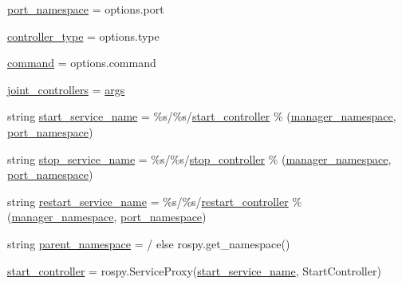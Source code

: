 \begin{DoxyCompactItemize}
\hyperlink{namespacecontroller__spawner_a831390a07e2261094656c09e0d262c14}{port\+\_\+namespace} = options.\+port
\item 
\hyperlink{namespacecontroller__spawner_a6aa09cb289adac00daaf52560e8c93ad}{controller\+\_\+type} = options.\+type
\item 
\hyperlink{namespacecontroller__spawner_a982ec8d1714fc314b5e85fc8d377abdb}{command} = options.\+command
\item 
\hyperlink{namespacecontroller__spawner_a4e454e12ceb216c43975a5ad8abee590}{joint\+\_\+controllers} = \hyperlink{namespacecontroller__spawner_aa4c2175a779b73777468233b45686392}{args}
\item 
string \hyperlink{namespacecontroller__spawner_a6f3556c19afc583ff9e7be62141ea1e3}{start\+\_\+service\+\_\+name} = \textquotesingle{}\%s/\%s/\hyperlink{namespacecontroller__spawner_a1bf65f27733e8e5fcb255dd8d369da6d}{start\+\_\+controller}\textquotesingle{} \% (\hyperlink{namespacecontroller__spawner_aee6b2ce8cdb4e7ffd894cbe211b09a0c}{manager\+\_\+namespace}, \hyperlink{namespacecontroller__spawner_a831390a07e2261094656c09e0d262c14}{port\+\_\+namespace})
\item 
string \hyperlink{namespacecontroller__spawner_addbe1e6c1654b63878f7d1d23d201d25}{stop\+\_\+service\+\_\+name} = \textquotesingle{}\%s/\%s/\hyperlink{namespacecontroller__spawner_abb7c023c547b422e17287d367fe0de8e}{stop\+\_\+controller}\textquotesingle{} \% (\hyperlink{namespacecontroller__spawner_aee6b2ce8cdb4e7ffd894cbe211b09a0c}{manager\+\_\+namespace}, \hyperlink{namespacecontroller__spawner_a831390a07e2261094656c09e0d262c14}{port\+\_\+namespace})
\item 
string \hyperlink{namespacecontroller__spawner_ae74db8f9d8ea66394dacfe6b0838e0b9}{restart\+\_\+service\+\_\+name} = \textquotesingle{}\%s/\%s/\hyperlink{namespacecontroller__spawner_ad1bd5e722a8cd83baf3a907520853c2d}{restart\+\_\+controller}\textquotesingle{} \% (\hyperlink{namespacecontroller__spawner_aee6b2ce8cdb4e7ffd894cbe211b09a0c}{manager\+\_\+namespace}, \hyperlink{namespacecontroller__spawner_a831390a07e2261094656c09e0d262c14}{port\+\_\+namespace})
\item 
string \hyperlink{namespacecontroller__spawner_abe41f324d94d5b87c5c723b71513c4e4}{parent\+\_\+namespace} = \textquotesingle{}/\textquotesingle{} else rospy.\+get\+\_\+namespace()
\item 
\hyperlink{namespacecontroller__spawner_a1bf65f27733e8e5fcb255dd8d369da6d}{start\+\_\+controller} = rospy.\+Service\+Proxy(\hyperlink{namespacecontroller__spawner_a6f3556c19afc583ff9e7be62141ea1e3}{start\+\_\+service\+\_\+name}, Start\+Controller)

\end{DoxyCompactItemize}
